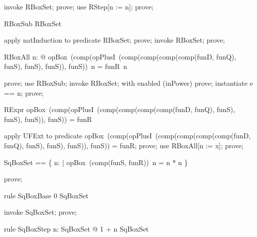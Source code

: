\documentclass{article}
\begin{document}
\begin{zproof}
invoke RBoxSet;
prove;
use RStep[n := n];
prove;
\end{zproof}

\begin{theorem}{RBoxSub}
  \nat \subseteq RBoxSet
\end{theorem}

\begin{zproof}
apply natInduction to predicate \nat \subseteq RBoxSet;
prove;
invoke RBoxSet;
prove;
\end{zproof}

\begin{theorem}{RBoxAll}
  \forall n: \nat @ opBox~(comp(opPlusI~(comp(comp(comp(comp(funD, funQ), funS), funS), funS)), funS))~n = funR~n
\end{theorem}

\begin{zproof}
prove;
use RBoxSub;
invoke RBoxSet;
with enabled (inPower) prove;
instantiate e == n;
prove;
\end{zproof}

\begin{theorem}{RExpr}
  opBox~(comp(opPlusI~(comp(comp(comp(comp(funD, funQ), funS), funS), funS)), funS)) = funR
\end{theorem}

\begin{zproof}
apply UFExt to predicate opBox~(comp(opPlusI~(comp(comp(comp(comp(funD, funQ), funS), funS), funS)), funS)) = funR;
prove;
use RBoxAll[n := x];
prove;
\end{zproof}

\begin{zed}
  SqBoxSet == \{ n: \nat | opBox~(comp(funS, funR))~n = n * n \}
\end{zed}

\begin{zproof}
prove;
\end{zproof}

\begin{theorem}{rule SqBoxBase}
  0 \in SqBoxSet
\end{theorem}

\begin{zproof}
invoke SqBoxSet;
prove;
\end{zproof}

\begin{theorem}{rule SqBoxStep}
  \forall n: SqBoxSet @ 1 + n \in SqBoxSet
\end{theorem}
\end{document}
